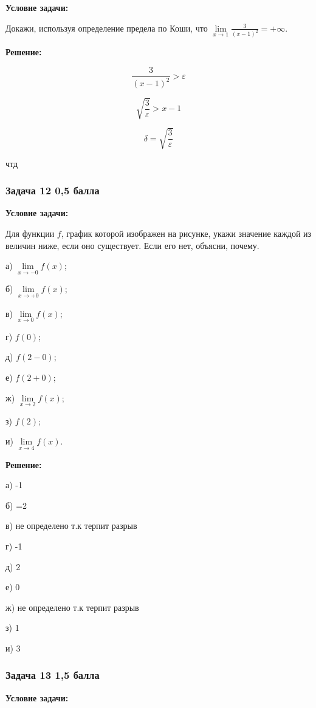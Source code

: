 \documentclass[a4paper,12pt]{article}
\begin{document}
\textbf{Условие задачи:}

Докажи, используя определение предела по Коши, что $\lim\limits_{x \to 1} \frac{3}{(x - 1)^2} = +\infty$.

\textbf{Решение: }

\[
\frac{3}{(x-1)^2} > \varepsilon
\]

\[
\sqrt{\frac{3}{\varepsilon}}> x-1
\]

\[
\delta = \sqrt{\frac{3}{\varepsilon}}
\]

чтд
\vspace{1cm}

\subsubsection{Задача 12 \hfill 0,5 балла}

\textbf{Условие задачи:}

Для функции $f$, график которой изображен на рисунке, укажи значение каждой из величин ниже, если оно существует. Если его нет, объясни, почему.

а) $\lim\limits_{x \to -0} f(x)$;

б) $\lim\limits_{x \to +0} f(x)$;

в) $\lim\limits_{x \to 0} f(x)$;

г) $f(0)$;

д) $f(2 - 0)$;

е) $f(2 + 0)$;

ж) $\lim\limits_{x \to 2} f(x)$;

з) $f(2)$;

и) $\lim\limits_{x \to 4} f(x)$.

\textbf{Решение: }

а) -1

б) =2

в) не определено т.к терпит разрыв

г) -1

д) 2

е) 0

ж) не определено т.к терпит разрыв

з) 1

и) 3

\vspace{1cm}

\subsubsection{Задача 13 \hfill 1,5 балла}

\textbf{Условие задачи:}
\end{document}

